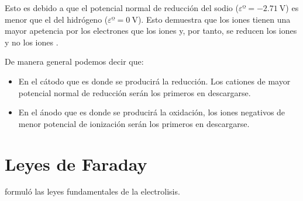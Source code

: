     Esto es debido a que el potencial normal de reducción del sodio (\(\varepsilon\text{º} = \SI{-2.71}{\volt}\)) es menor que el del hidrógeno  (\(\varepsilon\text{º} = \SI{0}{\volt}\)). Esto demuestra que los iones  tienen una mayor apetencia por los electrones que los iones  y, por tanto, se reducen los iones   y no los iones .

    De manera general podemos decir que:

    \begin{itemize}
        \item En el cátodo que es donde se producirá la reducción.
        Los cationes de mayor potencial normal de reducción serán los primeros en descargarse.
        \item En el ánodo que es donde se producirá la oxidación, los iones negativos de menor potencial de ionización serán los primeros en descargarse.
    \end{itemize}


    \section{Leyes de Faraday}\label{sec:leyes-de-faraday}

     formuló las leyes fundamentales de la electrolisis.


